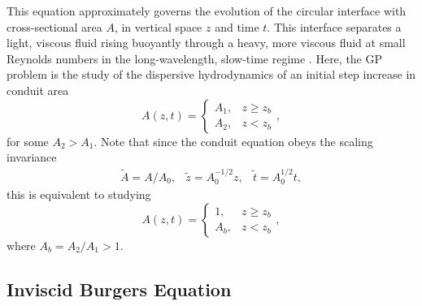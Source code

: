 \documentclass{jfm}
\begin{document}
\noindent
This equation approximately governs the evolution of the circular
interface with cross-sectional area $A$, in vertical space $z$ and time $t$. This interface separates a light, viscous
fluid rising buoyantly through a heavy, more viscous fluid
at small Reynolds numbers in the long-wavelength, slow-time regime \cite{scott_observations_1986,lowman_dispersive_2013}.
Here, the GP problem is the study of the dispersive hydrodynamics of an initial step increase in conduit area 
\begin{equation}\label{eq:GP}
    A(z,t) = \begin{cases}
                A_1, & z\geq z_b \\
                A_2, & z<z_b
             \end{cases},
\end{equation}
for some $A_2>A_1$. 
Note that since the conduit equation obeys the scaling invariance
\begin{equation}\label{eq:scaling1}
  \begin{array}{ccc}
    \tilde{A}=A/A_0, & \tilde{z}=A_0^{-1/2}z,  & \tilde{t} = A_0^{1/2}t,
  \end{array}
\end{equation}
this is equivalent to studying
\begin{equation}\label{eq:GPscaled}
    A(z,t) = \begin{cases}
                1,   & z\geq z_b \\
                A_b, & z<z_b
             \end{cases},
\end{equation}
where $A_b = A_2/A_1 > 1$.

\subsection{Inviscid Burgers Equation}\label{sec:Inv-Bur-EQ}

\end{document}
